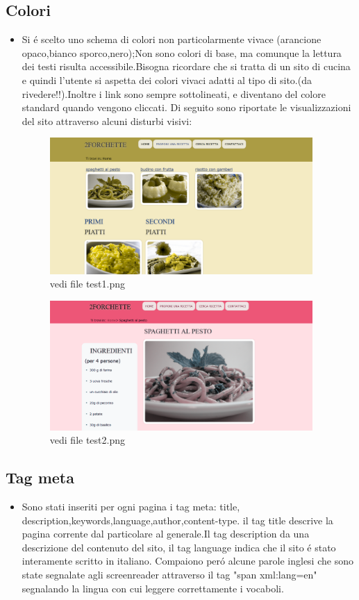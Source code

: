 \documentclass[12pt]{article}
\begin{document}
			\subsection{Colori}
			\begin{itemize}
				\item Si \'e scelto uno schema di colori non particolarmente vivace (arancione opaco,bianco sporco,nero);Non sono colori di base, ma comunque la lettura dei testi risulta accessibile.Bisogna ricordare che si tratta di un sito di cucina e quindi l'utente si aspetta dei colori vivaci adatti al tipo di sito.(da rivedere!!).Inoltre i link sono sempre sottolineati, e diventano del colore standard quando vengono cliccati.
				Di seguito sono riportate le visualizzazioni del sito attraverso alcuni disturbi visivi:
				
			
			\begin{figure}[ht!]
				\centering
				\includegraphics[width=100mm]{test1}
				\caption{vedi file test1.png}
			\end{figure}

				\begin{figure}[ht!]
					\centering
					\includegraphics[width=100mm]{test2}
					\caption{vedi file test2.png}
				\end{figure}
			\end{itemize}
			\subsection{Tag meta}
			\begin{itemize}
				\item Sono stati inseriti per ogni pagina i tag meta: title, description,keywords,language,author,content-type.
				il tag title descrive la pagina corrente dal particolare al generale.Il tag description da una descrizione del contenuto del sito, il tag language indica che il sito \'e stato interamente scritto in italiano. Compaiono per\'o alcune parole inglesi che sono state segnalate agli screenreader attraverso il tag "span xml:lang=en" segnalando la lingua con cui leggere correttamente i vocaboli. 
			\end{itemize}
\end{document}
